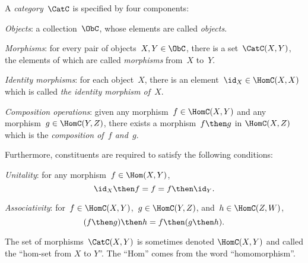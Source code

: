 \begin{shaded}
\begin{definition}[Category] \label{def:categorymain}
A \emph{category}~$\CatC$ is specified by four components:
\begin{compactenum}
\item \emph{Objects}: a collection\footnotemark~$\ObC$, whose elements are called \emph{objects}.
\item \emph{Morphisms}: for every pair of objects~$X,Y\in \ObC$, there is a set~$\CatC(X,Y)$, the elements of which are called
\emph{morphisms} from~$X$ to~$Y$.
\item \emph{Identity morphisms}: for each object~$X$, there is
an element~$\id_X \in \HomC(X,X) $ which is called \emph{the identity
morphism of~$X$}.
\item \emph{Composition operations}: given any morphism~$f \in  \HomC(X,Y)$ and any morphism~$g \in \HomC(Y, Z)$, there exists a morphism~$f\then g$ in $\HomC(X,Z)$ which is the \emph{composition of~$f$ and~$g$}.
\end{compactenum}

Furthermore, constituents are required to satisfy the following conditions:

\begin{compactenum}
    \item \emph{Unitality}: for any morphism~$f\in\Hom(X,Y)$,
    \begin{equation}
        \id_X \then f= f = f \then \id_Y.
    \end{equation}
    \item \emph{Associativity}: for~$f\in \HomC(X,Y)$,~$g\in \HomC(Y,Z)$, and~$h\in \HomC(Z,W)$,
    \begin{equation}
        (f\then g)\then h= f \then (g \then h).
    \end{equation}
\end{compactenum}

\end{definition}
\end{shaded}

\begin{remark}
The set of morphisms~$\CatC(X,Y)$ is sometimes denoted $\HomC(X,Y)$ and called the ``hom-set from $X$ to $Y$''. The ``Hom'' comes from the word ``homomorphism''.
\end{remark}

